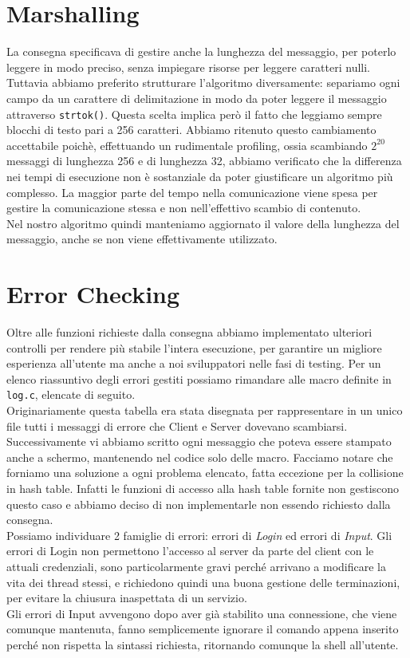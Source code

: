 \documentclass[a4paper, 11pt]{article} %
\begin{document}
\section*{Marshalling}
La consegna specificava di gestire anche la lunghezza del messaggio, per poterlo leggere in modo preciso, senza impiegare risorse per leggere caratteri nulli. Tuttavia abbiamo preferito strutturare l'algoritmo diversamente: separiamo ogni campo da un carattere di delimitazione in modo da poter leggere il messaggio attraverso \texttt{strtok()}. Questa scelta implica però il fatto che leggiamo sempre blocchi di testo pari a 256 caratteri. Abbiamo ritenuto  questo cambiamento accettabile poichè, effettuando un rudimentale profiling, ossia scambiando $2^{20}$ messaggi di lunghezza 256 e di lunghezza 32, abbiamo verificato che la differenza nei tempi di esecuzione non è sostanziale da poter giustificare un algoritmo più complesso. La maggior parte del tempo nella comunicazione viene spesa per gestire la comunicazione stessa e non nell'effettivo scambio di contenuto.\\
Nel nostro algoritmo quindi manteniamo aggiornato il valore della lunghezza del messaggio, anche se non viene effettivamente utilizzato. 

\section*{Error Checking}
Oltre alle funzioni richieste dalla consegna abbiamo implementato ulteriori controlli per rendere più stabile l'intera esecuzione, per garantire un migliore esperienza all'utente ma anche a noi sviluppatori nelle fasi di testing. Per un elenco riassuntivo degli errori gestiti possiamo rimandare alle macro definite in \texttt{log.c}, elencate di seguito.\\

Originariamente questa tabella era stata disegnata per rappresentare in un unico file tutti i messaggi di errore che Client e Server dovevano scambiarsi. Successivamente vi abbiamo scritto ogni messaggio che poteva essere stampato anche a schermo, mantenendo nel codice solo delle macro. Facciamo notare che forniamo una soluzione a ogni problema elencato, fatta eccezione per la collisione in hash table. Infatti le funzioni di accesso alla hash table fornite non gestiscono questo caso e abbiamo deciso di non implementarle non essendo richiesto dalla consegna.\\
Possiamo individuare 2 famiglie di errori: errori di \textit{Login} ed errori di \textit{Input}. Gli errori di Login non permettono l'accesso al server da parte del client con le attuali credenziali, sono particolarmente gravi perché arrivano a modificare la vita dei thread stessi, e richiedono quindi una buona gestione delle terminazioni, per evitare la chiusura inaspettata di un servizio.\\
Gli errori di Input avvengono dopo aver già stabilito una connessione, che viene comunque mantenuta, fanno semplicemente ignorare il comando appena inserito perché non rispetta la sintassi richiesta, ritornando comunque la shell all'utente.\\
\end{document}
